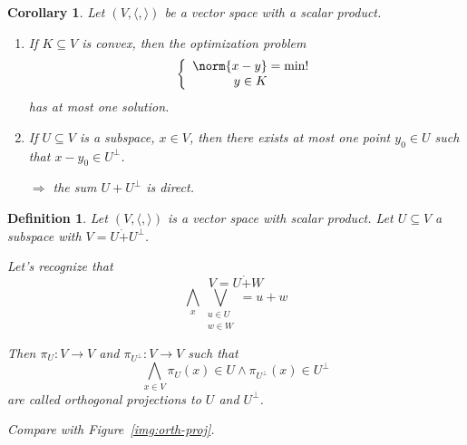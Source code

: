 \documentclass[a4paper,landscape,twocolumn]{article}
\newtheorem{defi}{Definition}
\newtheorem{cor}{Corollary}
\DeclarePairedDelimiter\norm\lVert\rVert
\begin{document}
\begin{cor}
  Let $(V, \langle, \rangle)$ be a vector space with a scalar product.
  \begin{enumerate}
    \item If $K \subseteq V$ is convex, then the optimization problem
      \[
        \left\{
          \begin{array}{c}
            \norm{x - y} = \text{min!} \\
            y \in K
          \end{array}
        \right.
      \]
      has at most one solution.
    \item If $U \subseteq V$ is a subspace, $x \in V$, then there exists at most
      one point $y_0 \in U$ such that $x - y_0 \in U^\bot$.

      $\Rightarrow$ the sum $U + U^\bot$ is direct.
  \end{enumerate}
\end{cor}

\begin{defi}
  Let $(V, \langle, \rangle)$ is a vector space with scalar product.
  Let $U \subseteq V$ a subspace with $V = U \dot{+} U^\bot$.

  Let's recognize that
  \[ V = U \dot{+} W \]
  \[ \bigwedge_{x} \bigvee_{\substack{u \in U \\ w \in W}} = u + w \]

  Then $\pi_U: V \to V$ and $\pi_{U^\bot}: V \to V$ such that
  \[ \bigwedge_{x \in V} \pi_U(x) \in U \land \pi_{U^\bot}(x) \in U^\bot \]
  are called \emph{orthogonal projections} to $U$ and $U^\bot$.

  Compare with Figure~\ref{img:orth-proj}.
\end{defi}
\end{document}
